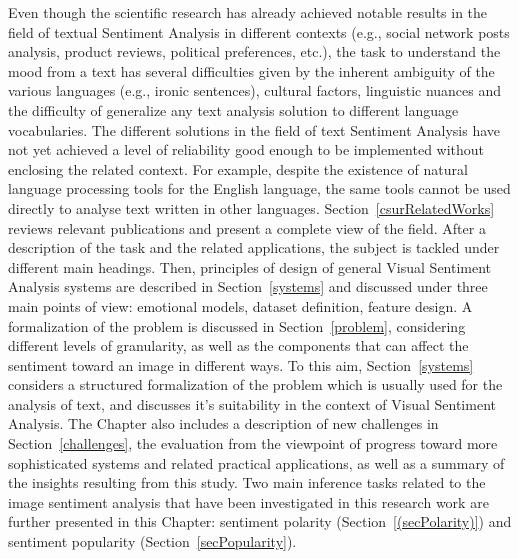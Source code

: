 Even though the scientific research has already achieved notable results in the field of textual Sentiment Analysis in different contexts (e.g., social network posts analysis, product reviews, political preferences, etc.), the task to understand the mood from a text has several difficulties given by the inherent ambiguity of the various languages (e.g., ironic sentences), cultural factors, linguistic nuances and the difficulty of generalize any text analysis solution to different language vocabularies. The different solutions in the field of text Sentiment Analysis have not yet achieved a level of reliability good enough to be implemented without enclosing the related context. For example, despite the existence of natural language processing tools for the English language, the same tools cannot be used directly to analyse text written in other languages.
Section~\ref{csurRelatedWorks} reviews relevant publications and present a complete view of the field. After a description of the task and the related applications, the subject is tackled under different main headings. 
Then, principles of design of general Visual Sentiment Analysis systems are described in Section~\ref{systems} and discussed under three main points of view: emotional models, dataset definition, feature design.
A formalization of the problem is discussed in Section~\ref{problem}, considering different levels of granularity, as well as the components that can affect the sentiment toward an image in different ways. To this aim, Section~\ref{systems} considers a structured formalization of the problem which is usually used for the analysis of text, and discusses it's suitability in the context of Visual Sentiment Analysis. 
The Chapter also includes a description of new challenges in Section~\ref{challenges}, the evaluation from the viewpoint of progress toward more sophisticated systems and related practical applications, as well as a summary of the insights resulting from this study.
Two main inference tasks related to the image sentiment analysis that have been investigated in this research work are further presented in this Chapter: sentiment polarity (Section~\ref{(secPolarity)}) and sentiment popularity (Section~\ref{secPopularity}). 

